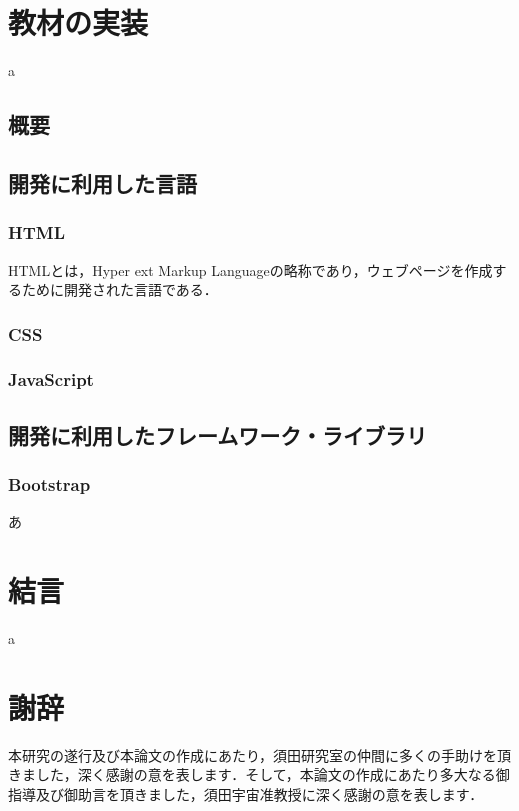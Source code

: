 \documentclass[12pt,a4j,titlepage]{ltjsarticle}
\begin{document}
\clearpage

\section{教材の実装}%
a
\subsection{概要}
\subsection{開発に利用した言語}
\subsubsection{HTML}
HTMLとは，Hyper ext Markup Languageの略称であり，ウェブページを作成するために開発された言語である．
\subsubsection{CSS}
\subsubsection{JavaScript}

\subsection{開発に利用したフレームワーク・ライブラリ}
\subsubsection{Bootstrap}
あ

\clearpage

\section{結言}%
a
\clearpage

\section{謝辞}%
本研究の遂行及び本論文の作成にあたり，須田研究室の仲間に多くの手助けを頂きました，深く感謝の意を表します．そして，本論文の作成にあたり多大なる御指導及び御助言を頂きました，須田宇宙准教授に深く感謝の意を表します．
\clearpage
\end{document}
